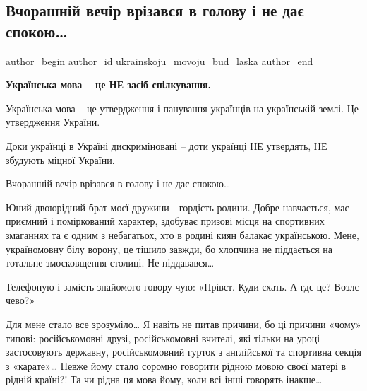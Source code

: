  
 
 
 
 
 
\subsection{Вчорашній вечір врізався в голову і не дає спокою…}
\label{sec:06_10_2021.fb.ukrainskoju_movoju_bud_laska.1.razgovor_mova_kiev}
 
\ifcmt
 author_begin
   author_id ukrainskoju_movoju_bud_laska
 author_end
\fi

\begin{center}
	\begin{fminipage}{0.9\textwidth}
\Large\bfseries\color{orange}
Українська мова – це НЕ засіб спілкування. 

Українська мова – це утвердження і панування українців на українській землі. Це
утвердження України. 

Доки українці в Україні дискриміновані – доти українці НЕ утвердять, НЕ
збудують міцної України. 
	\end{fminipage}
\end{center}

Вчорашній вечір врізався в голову і не дає спокою…

Юний двоюрідний брат моєї дружини - гордість родини. Добре навчається, має
приємний і поміркований характер, здобуває призові місця на спортивних
змаганнях та є одним з небагатьох, хто в родині киян балакає українською. Мене,
україномовну білу ворону, це тішило завжди, бо хлопчина не піддається на
тотальне змосковщення столиці. Не піддавався…

Телефоную і замість знайомого говору чую: «Прівєт. Куди єхать. А гдє це? Возлє
чево?»

Для мене стало все зрозуміло… Я навіть не питав причини, бо ці причини «чому»
типові: російськомовні друзі, російськомовні вчителі, які тільки на уроці
застосовують державну, російськомовний гурток з англійської та спортивна секція
з «карате»… Невже йому стало соромно говорити рідною мовою своєї матері в
рідній країні?! Та чи рідна ця мова йому, коли всі інші говорять інакше…

